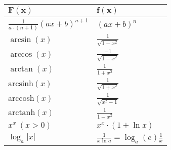 \begin{center}
  \begin{tabularx}{\linewidth}{>{\centering\arraybackslash}X>{\centering\arraybackslash}X}
  \toprule
  $\mathbf{F(x)}$ & $\mathbf{f(x)}$ \\
  \midrule
  $\frac{1}{a\cdot (n+1)}(ax+b)^{n+1}$ & $(ax+b)^n$ \\
  
  $\arcsin(x)$ & $\frac{1}{\sqrt{1 - x^2}}$ \\
  $\arccos(x)$ & $\frac{-1}{\sqrt{1 - x^2}}$ \\
  $\arctan(x)$ & $\frac{1}{1 + x^2}$ \\ 
  $\text{arcsinh}(x)$ & $\frac{1}{\sqrt{1 + x^2}}$ \\
  $\text{arccosh}(x) $ & $\frac{1}{\sqrt{x^2 - 1}}$ \\
  $\text{arctanh}(x) $ & $\frac{1}{1 - x^2}$ \\ 
  $x^x \ (x > 0)$ & $x^x \cdot (1 + \ln x)$ \\
  $\log_a|x|$ & $\frac{1}{x \ln a}=\log_a(e)\frac{1}{x}$ \\
  \bottomrule
  \end{tabularx}
\end{center}








